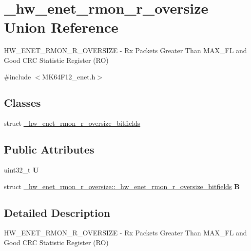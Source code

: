 \hypertarget{union__hw__enet__rmon__r__oversize}{}\section{\+\_\+hw\+\_\+enet\+\_\+rmon\+\_\+r\+\_\+oversize Union Reference}
\label{union__hw__enet__rmon__r__oversize}


H\+W\+\_\+\+E\+N\+E\+T\+\_\+\+R\+M\+O\+N\+\_\+\+R\+\_\+\+O\+V\+E\+R\+S\+I\+ZE -\/ Rx Packets Greater Than M\+A\+X\+\_\+\+FL and Good C\+RC Statistic Register (RO)  




{\ttfamily \#include $<$M\+K64\+F12\+\_\+enet.\+h$>$}

\subsection*{Classes}
\begin{DoxyCompactItemize}
\item 
struct \hyperlink{struct__hw__enet__rmon__r__oversize_1_1__hw__enet__rmon__r__oversize__bitfields}{\+\_\+hw\+\_\+enet\+\_\+rmon\+\_\+r\+\_\+oversize\+\_\+bitfields}
\end{DoxyCompactItemize}
\subsection*{Public Attributes}
\begin{DoxyCompactItemize}
\item 
uint32\+\_\+t {\bfseries U}\hypertarget{union__hw__enet__rmon__r__oversize_a164d9b16cbd5773299220764c7c20b55}{}\label{union__hw__enet__rmon__r__oversize_a164d9b16cbd5773299220764c7c20b55}

\item 
struct \hyperlink{struct__hw__enet__rmon__r__oversize_1_1__hw__enet__rmon__r__oversize__bitfields}{\+\_\+hw\+\_\+enet\+\_\+rmon\+\_\+r\+\_\+oversize\+::\+\_\+hw\+\_\+enet\+\_\+rmon\+\_\+r\+\_\+oversize\+\_\+bitfields} {\bfseries B}\hypertarget{union__hw__enet__rmon__r__oversize_a1893ed0b9fa0414b968f99c8b1427b75}{}\label{union__hw__enet__rmon__r__oversize_a1893ed0b9fa0414b968f99c8b1427b75}

\end{DoxyCompactItemize}


\subsection{Detailed Description}
H\+W\+\_\+\+E\+N\+E\+T\+\_\+\+R\+M\+O\+N\+\_\+\+R\+\_\+\+O\+V\+E\+R\+S\+I\+ZE -\/ Rx Packets Greater Than M\+A\+X\+\_\+\+FL and Good C\+RC Statistic Register (RO) 

